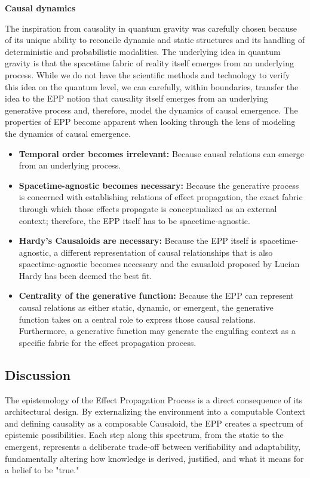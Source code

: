 \textbf{Causal dynamics}

The inspiration from causality in quantum gravity was carefully chosen because of its unique ability to reconcile dynamic and static structures and its handling of deterministic and probabilistic modalities. The underlying idea in quantum gravity is that the spacetime fabric of reality itself emerges from an underlying process. While we do not have the scientific methods and technology to verify this idea on the quantum level, we can carefully, within boundaries, transfer the idea to the EPP notion that causality itself emerges from an underlying generative process and, therefore, model the dynamics of causal emergence. The properties of EPP become apparent when looking through the lens of modeling the dynamics of causal emergence.

\begin{itemize}
    \item \textbf{Temporal order becomes irrelevant:} Because causal relations can emerge from an underlying process.
    \item \textbf{Spacetime-agnostic becomes necessary:} Because the generative process is concerned with establishing relations of effect propagation, the exact fabric through which those effects propagate is conceptualized as an external context; therefore, the EPP itself has to be spacetime-agnostic.
    \item \textbf{Hardy's Causaloids are necessary:} Because the EPP itself is spacetime-agnostic, a different representation of causal relationships that is also spacetime-agnostic becomes necessary and the causaloid proposed by Lucian Hardy has been deemed the best fit.
    \item \textbf{Centrality of the generative function:} Because the EPP can represent causal relations as either static, dynamic, or emergent, the generative function takes on a central role to express those causal relations. Furthermore, a generative function may generate the engulfing context as a specific fabric for the effect propagation process.
\end{itemize}

\newpage

\subsection{Discussion}

The epistemology of the Effect Propagation Process is a direct consequence of its architectural design. By externalizing the environment into a computable Context and defining causality as a composable Causaloid, the EPP creates a spectrum of epistemic possibilities. Each step along this spectrum, from the static to the emergent, represents a deliberate trade-off between verifiability and adaptability, fundamentally altering how knowledge is derived, justified, and what it means for a belief to be "true."

